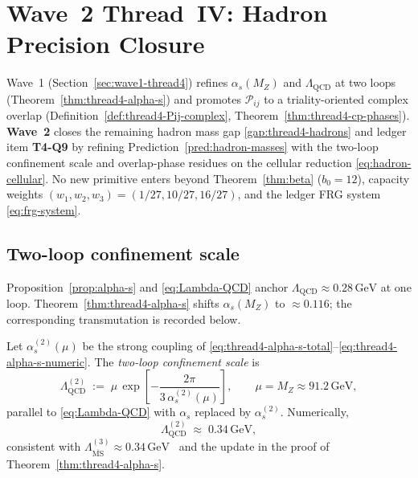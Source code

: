 \section{Wave~2 Thread~IV: Hadron Precision Closure}
\label{sec:wave2-thread4}

Wave~1 (Section~\ref{sec:wave1-thread4}) refines $\alpha_s(M_Z)$ and
$\Lambda_{\mathrm{QCD}}$ at two loops (Theorem~\ref{thm:thread4-alpha-s}) and
promotes $\mathcal{P}_{ij}$ to a triality-oriented complex overlap
(Definition~\ref{def:thread4-Pij-complex}, Theorem~\ref{thm:thread4-cp-phases}).
\textbf{Wave~2} closes the remaining hadron mass gap
\ref{gap:thread4-hadrons} and ledger item \textbf{T4-Q9} by refining
Prediction~\ref{pred:hadron-masses} with the two-loop confinement scale and
overlap-phase residues on the cellular reduction
\eqref{eq:hadron-cellular}. No new primitive enters beyond Theorem~\ref{thm:beta}
($b_0=12$), capacity weights $(w_1,w_2,w_3)=(1/27,10/27,16/27)$, and the
ledger FRG system \eqref{eq:frg-system}.

\subsection{Two-loop confinement scale}
\label{sec:wave2-thread4:lambda}

Proposition~\ref{prop:alpha-s} and \eqref{eq:Lambda-QCD} anchor
$\Lambda_{\mathrm{QCD}}\approx 0.28\,\mathrm{GeV}$ at one loop.
Theorem~\ref{thm:thread4-alpha-s} shifts $\alpha_s(M_Z)$ to
$\approx 0.116$; the corresponding transmutation is recorded below.

\begin{definition}
\label{def:thread4-Lambda-2loop}
Let $\alpha_s^{(2)}(\mu)$ be the strong coupling of
\eqref{eq:thread4-alpha-s-total}--\eqref{eq:thread4-alpha-s-numeric}. The
\emph{two-loop confinement scale} is
\begin{equation}\label{eq:thread4-Lambda-2loop}
  \Lambda_{\mathrm{QCD}}^{(2)}
  \;:=\;
  \mu\,
  \exp\!\left[
    -\frac{2\pi}{3\,\alpha_s^{(2)}(\mu)}
  \right],
  \qquad
  \mu=M_Z\approx 91.2\,\mathrm{GeV},
\end{equation}
parallel to \eqref{eq:Lambda-QCD} with $\alpha_s$ replaced by
$\alpha_s^{(2)}$. Numerically,
\begin{equation}\label{eq:thread4-Lambda-numeric}
  \Lambda_{\mathrm{QCD}}^{(2)}
  \;\approx\;
  0.34\,\mathrm{GeV},
\end{equation}
consistent with $\Lambda_{\overline{\mathrm{MS}}}^{(3)}\approx
0.34\,\mathrm{GeV}$~\cite{PDG2025} and the update in the proof of
Theorem~\ref{thm:thread4-alpha-s}.
\end{definition}

